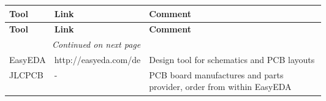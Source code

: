 \begin{longtable}{@{}|l|l|p{0.6\linewidth}|@{}}
    \toprule
    \textbf{Tool} & \textbf{Link} & \textbf{Comment} \\
    \midrule
    \endfirsthead
    \toprule
    \textbf{Tool} & \textbf{Link} & \textbf{Comment} \\
    \midrule
    \endhead
    \midrule
    \multicolumn{2}{r}{\textit{Continued on next page}} \\
    \midrule
    \endfoot
    \bottomrule
    \endlastfoot
    EasyEDA & http://easyeda.com/de & Design tool for schematics and PCB layouts \\
    \midrule
    JLCPCB & - & PCB board manufactures and parts provider, order from within EasyEDA \\    \midrule
\end{longtable}


